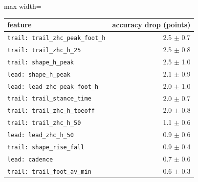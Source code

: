 \begin{adjustbox}{max width=\textwidth}
{\footnotesize
\begin{tabular}{lr}
\toprule
\textbf{feature} & \textbf{accuracy drop (points)} \\
\midrule
\texttt{trail: trail\_\allowbreak{}zhc\_\allowbreak{}peak\_\allowbreak{}foot\_\allowbreak{}h} & 2.5 $\pm$ 0.7 \\
\texttt{trail: trail\_\allowbreak{}zhc\_\allowbreak{}h\_\allowbreak{}25} & 2.5 $\pm$ 0.8 \\
\texttt{trail: shape\_\allowbreak{}h\_\allowbreak{}peak} & 2.5 $\pm$ 1.0 \\
\texttt{lead: shape\_\allowbreak{}h\_\allowbreak{}peak} & 2.1 $\pm$ 0.9 \\
\texttt{lead: lead\_\allowbreak{}zhc\_\allowbreak{}peak\_\allowbreak{}foot\_\allowbreak{}h} & 2.0 $\pm$ 1.0 \\
\texttt{trail: trail\_\allowbreak{}stance\_\allowbreak{}time} & 2.0 $\pm$ 0.7 \\
\texttt{trail: trail\_\allowbreak{}zhc\_\allowbreak{}h\_\allowbreak{}toeoff} & 2.0 $\pm$ 0.8 \\
\texttt{trail: trail\_\allowbreak{}zhc\_\allowbreak{}h\_\allowbreak{}50} & 1.1 $\pm$ 0.6 \\
\texttt{lead: lead\_\allowbreak{}zhc\_\allowbreak{}h\_\allowbreak{}50} & 0.9 $\pm$ 0.6 \\
\texttt{trail: shape\_\allowbreak{}rise\_\allowbreak{}fall} & 0.9 $\pm$ 0.4 \\
\texttt{lead: cadence} & 0.7 $\pm$ 0.6 \\
\texttt{trail: trail\_\allowbreak{}foot\_\allowbreak{}av\_\allowbreak{}min} & 0.6 $\pm$ 0.3 \\
\bottomrule
\end{tabular}
}
\end{adjustbox}
